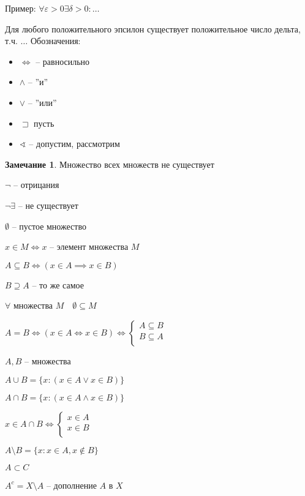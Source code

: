 \documentclass{book}
\renewcommand\O{\ensuremath{\emptyset}}
\theoremstyle{definition}
\newtheorem*{note}{Замечание}
\begin{document}
    Пример: $\forall \varepsilon>0 \exists  \delta>0 :\ldots$

   Для любого положительного эпсилон существует положительное число дельта, т.ч. $\ldots$
    Обозначения:
    \begin{itemize}
        \item $\iff $ -- равносильно
        \item $\wedge$ -- ''и''
        \item $\vee$ -- ''или''
        \item $\sqsupset $ пусть
        \item $\sphericalangle$ -- допустим, рассмотрим
    \end{itemize}

    \begin{note}
        Множество всех множеств не существует

        $\neg$ -- отрицания

        $\neg \exists $ -- не существует
        
        $\O $ -- пустое множество

        $x\in M \iff x$ -- элемент множества $M$

        $A\subseteq B \iff  (x\in A \implies  x\in B)$

        $B\supseteq A$ -- то же самое
    \end{note}
    $\forall $ множества $M\quad \O \subseteq M$

    $A = B \iff  \left( x\in A \iff x\in B \right)  \iff \begin{cases}
        A\subseteq B\\
        B\subseteq A\\
    \end{cases}$
    
    
        $A,B$ -- множества 

        $A\cup B = \{x: (x\in A \vee x\in B)\}$
        
        $A\cap B = \{x: (x\in A \wedge x\in B)\}$

        $x\in A\cap B \iff  \begin{cases}
            x\in A\\
            x\in B\\
        \end{cases}$

        $A\setminus B = \{x:x \in A, x\not\in B \}$

        $A\subset C$

        $A^c = X\setminus A$ -- дополнение $A$ в $X$
\end{document}
